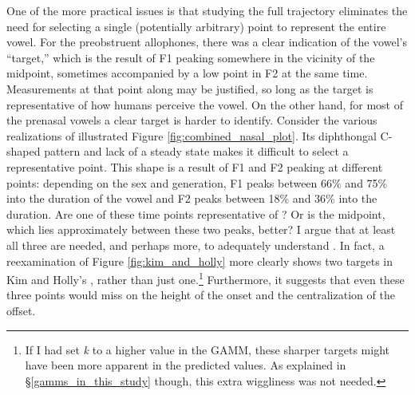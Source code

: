One of the more practical issues is that studying the full trajectory eliminates the need for selecting a single (potentially arbitrary) point to represent the entire vowel. For the preobstruent allophones, there was a clear indication of the vowel's ``target,'' which is the result of F1 peaking somewhere in the vicinity of the midpoint, sometimes accompanied by a low point in F2 at the same time. Measurements at that point along may be justified, so long as the target is representative of how humans perceive the vowel. On the other hand, for most of the prenasal vowels a clear target is harder to identify. Consider the various realizations of \ban illustrated Figure \ref{fig:combined_nasal_plot}. Its diphthongal C-shaped pattern and lack of a steady state makes it difficult to select a representative point. This shape is a result of F1 and F2 peaking at different points: depending on the sex and generation, F1 peaks between 66\% and 75\% into the duration of the vowel and F2 peaks between 18\% and 36\% into the duration. Are one of these time points representative of \ban? Or is the midpoint, which lies approximately between these two peaks, better? I argue that at least all three are needed, and perhaps more, to adequately understand \ban. In fact, a reexamination of Figure \ref{fig:kim_and_holly} more clearly shows two targets in Kim and Holly's \ban, rather than just one.\footnote{If I had set \textit{k} to a higher value in the GAMM, these sharper targets might have been more apparent in the predicted values. As explained in \S\ref{gamms_in_this_study} though, this extra wiggliness was not needed.} Furthermore, it suggests that even these three points would miss on the height of the onset and the centralization of the offset.

